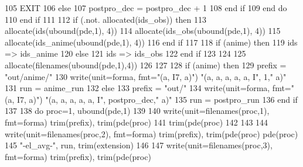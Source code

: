 \begin{DoxyCode}
105             \textcolor{keywordflow}{EXIT}
106           \textcolor{keywordflow}{else}
107             postpro_dec = postpro_dec + 1
108 \textcolor{keywordflow}{          end if}
109 \textcolor{keywordflow}{        end do}
110 \textcolor{keywordflow}{      end if}
111   
112       \textcolor{keywordflow}{if} (.not. \textcolor{keyword}{allocated}(ids\_obs)) \textcolor{keywordflow}{then}
113         \textcolor{keyword}{allocate}(ids(ubound(pde,1), 4))
114         \textcolor{keyword}{allocate}(ids\_obs(ubound(pde,1), 4))
115         \textcolor{keyword}{allocate}(ids\_anime(ubound(pde,1), 4))
116 \textcolor{keywordflow}{      end if}
117       
118       \textcolor{keywordflow}{if} (anime) \textcolor{keywordflow}{then}
119         ids => ids\_anime
120       \textcolor{keywordflow}{else}
121         ids => ids\_obs
122 \textcolor{keywordflow}{      end if}
123         
124 
125       \textcolor{keyword}{allocate}(filenames(ubound(pde,1),4))
126  
127       
128       \textcolor{keywordflow}{if} (anime) \textcolor{keywordflow}{then}
129         prefix = \textcolor{stringliteral}{"out/anime/"}
130         \textcolor{keyword}{write}(unit=forma, fmt=\textcolor{stringliteral}{"(a, I7, a)"}) \textcolor{stringliteral}{"(a, a, a, a, a, I"}, 1,\textcolor{stringliteral}{" a)"}
131         run = anime\_run
132       \textcolor{keywordflow}{else}
133         prefix = \textcolor{stringliteral}{"out/"}
134         \textcolor{keyword}{write}(unit=forma, fmt=\textcolor{stringliteral}{"(a, I7, a)"}) \textcolor{stringliteral}{"(a, a, a, a, a, I"}, postpro_dec,\textcolor{stringliteral}{" a)"}
135         run = postpro_run
136 \textcolor{keywordflow}{      end if}
137 
138       \textcolor{keywordflow}{do} proc=1, ubound(pde,1)
139 
140         \textcolor{keyword}{write}(unit=filenames(proc,1), fmt=forma) trim(prefix), trim(pde(proc)%
141 \textcolor{comment}{        trim(pde(proc)%
142 
143 
144         \textcolor{keyword}{write}(unit=filenames(proc,2), fmt=forma) trim(prefix), trim(pde(proc)%
      pde(proc)%
145 \textcolor{comment}{                                                  }\textcolor{stringliteral}{"-el\_avg-"},  run,  trim(extension)
146 
147         \textcolor{keyword}{write}(unit=filenames(proc,3), fmt=forma) trim(prefix), trim(pde(proc)%
}
\end{DoxyCode}
